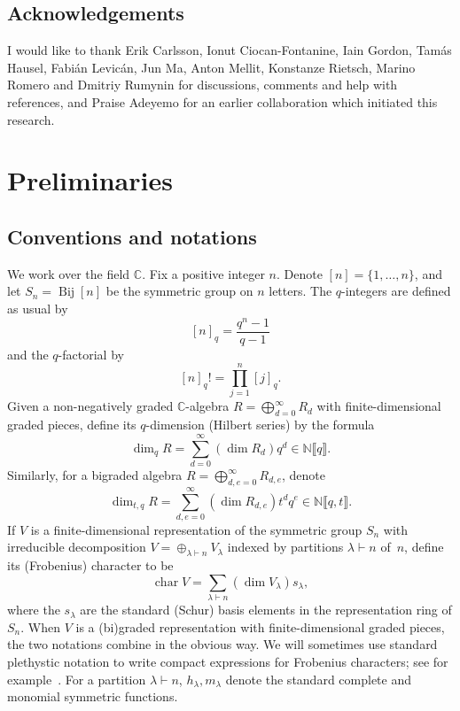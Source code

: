 \documentclass[a4paper,11pt]{amsart}
\theoremstyle{plain}
\theoremstyle{definition}
\newcommand{\C}{\mathbb{C}}
\newcommand{\CP}{\mathscr{P}}
\DeclareMathOperator{\cha}{char}
\DeclareMathOperator{\bij}{Bij}
\begin{document}
\subsection*{Acknowledgements} I would like to thank Erik Carlsson, Ionut Ciocan-Fontanine, Iain Gordon, Tam\'as Hausel, Fabi\'an Levi\-c\'an, Jun Ma, Anton Mellit, Konstanze Rietsch, Marino Romero and Dmitriy Rumynin for discussions, comments and help with references, and Praise Adeyemo for an earlier collaboration which initiated this research. 

\section{Preliminaries}
\subsection{Conventions and notations} \label{subsec:conv} We work over the field $\C$. Fix a positive integer $n$.
Denote $[n]=\{1, \ldots, n\}$, and let
$S_n=\bij[n]$ be the symmetric group on $n$ letters. 
The $q$-integers are defined as usual by 
\[ [n]_q = \frac{q^n-1}{q-1}\]
and the $q$-factorial by
\[ [n]_q! = \prod_{j=1}^n [j]_q.\]
Given a non-negatively graded $\C$-algebra $R=\bigoplus_{d=0}^\infty R_d$ with finite-dimensional graded pieces, define its $q$-dimension (Hilbert series) by the formula
\[\dim_q R = \sum_{d=0}^\infty (\dim R_d) q^d\in{\mathbb N}\llbracket q\rrbracket.
\]
Similarly, for a bigraded algebra $R=\bigoplus_{d,e=0}^\infty R_{d,e}$, denote
\[\dim_{t,q} R = \sum_{d,e=0}^\infty (\dim R_{d,e}) t^dq^e \in{\mathbb N}\llbracket q,t\rrbracket.
\]
If $V$ is a finite-dimensional representation of the symmetric group $S_n$ with irreducible decomposition $V=\oplus_{\lambda\vdash n} V_\lambda$ indexed by partitions $\lambda\vdash n$ of~$n$, define its (Frobenius) character to be
\[\cha V = \sum_{\lambda\vdash n} (\dim V_\lambda)s_\lambda, 
\]
where the $s_\lambda$ are the standard (Schur) basis elements in the representation ring of $S_n$. When $V$ is a 
(bi)graded representation with finite-dimensional graded pieces, the two notations combine in the obvious way. We will sometimes
use standard plethystic notation to write compact expressions for Frobenius characters; see for example~\cite[Sect.3.8]{Ber}. 
For a partition $\lambda\vdash n$, $h_\lambda, m_\lambda$ denote the standard complete and monomial symmetric functions.
\end{document}
